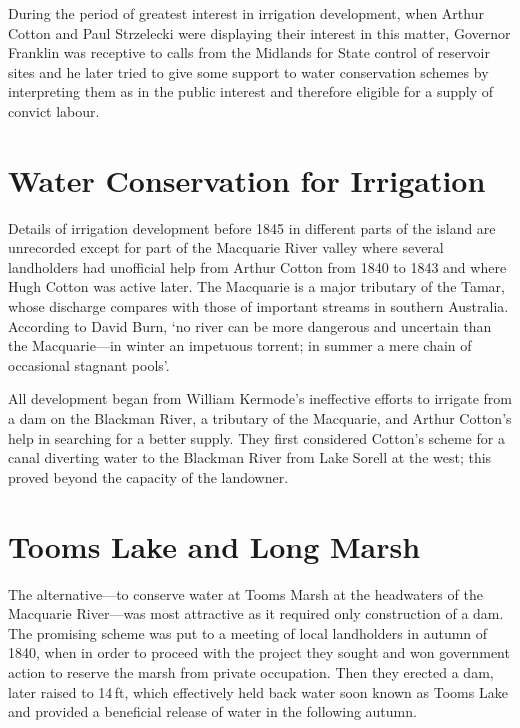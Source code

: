 During the period of greatest interest in irrigation development, when
Arthur Cotton and Paul Strzelecki were displaying their interest in
this matter, Governor Franklin was receptive to calls from the
Midlands for State control of reservoir sites and he later tried to
give some support to water conservation schemes by interpreting them
as in the public interest and therefore eligible for a supply of
convict labour.

\section*{Water Conservation for Irrigation}

Details of irrigation development before 1845 in different parts of
the island are unrecorded except for part of the Macquarie River
valley where several landholders had unofficial help from Arthur
Cotton from 1840 to 1843 and where Hugh Cotton was active later.  The
Macquarie is a major tributary of the Tamar, whose discharge compares
with those of important streams in southern Australia. According to
David Burn, `no river can be more dangerous and uncertain than the
Macquarie---in winter an impetuous torrent; in summer a mere chain
of occasional stagnant pools'.

All development began from William Kermode's ineffective efforts to
irrigate from a dam on the Blackman River, a tributary of the
Macquarie, and Arthur Cotton's help in searching for a better supply.
They first considered Cotton's scheme for a canal diverting water to
the Blackman River from Lake Sorell at the west; this proved beyond
the capacity of the landowner.

\section*{Tooms Lake and Long Marsh}

The alternative---to conserve water at Tooms Marsh at the headwaters
of the Macquarie River---was most attractive as it required only
construction of a dam.  The promising scheme was put to a meeting of
local landholders in autumn of 1840, when in order to proceed with the
project they sought and won government action to reserve the marsh
from private occupation.  Then they erected a dam, later raised to
14\,ft, which effectively held back water soon known as Tooms Lake and
provided a beneficial release of water in the following
autumn.

